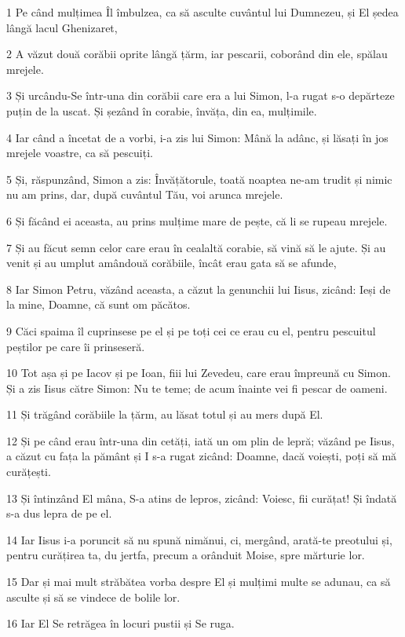 \par 1 Pe când mulțimea Îl îmbulzea, ca să asculte cuvântul lui Dumnezeu, și El ședea lângă lacul Ghenizaret,
\par 2 A văzut două corăbii oprite lângă țărm, iar pescarii, coborând din ele, spălau mrejele.
\par 3 Și urcându-Se într-una din corăbii care era a lui Simon, l-a rugat s-o depărteze puțin de la uscat. Și șezând în corabie, învăța, din ea, mulțimile.
\par 4 Iar când a încetat de a vorbi, i-a zis lui Simon: Mână la adânc, și lăsați în jos mrejele voastre, ca să pescuiți.
\par 5 Și, răspunzând, Simon a zis: Învățătorule, toată noaptea ne-am trudit și nimic nu am prins, dar, după cuvântul Tău, voi arunca mrejele.
\par 6 Și făcând ei aceasta, au prins mulțime mare de pește, că li se rupeau mrejele.
\par 7 Și au făcut semn celor care erau în cealaltă corabie, să vină să le ajute. Și au venit și au umplut amândouă corăbiile, încât erau gata să se afunde,
\par 8 Iar Simon Petru, văzând aceasta, a căzut la genunchii lui Iisus, zicând: Ieși de la mine, Doamne, că sunt om păcătos.
\par 9 Căci spaima îl cuprinsese pe el și pe toți cei ce erau cu el, pentru pescuitul peștilor pe care îi prinseseră.
\par 10 Tot așa și pe Iacov și pe Ioan, fiii lui Zevedeu, care erau împreună cu Simon. Și a zis Iisus către Simon: Nu te teme; de acum înainte vei fi pescar de oameni.
\par 11 Și trăgând corăbiile la țărm, au lăsat totul și au mers după El.
\par 12 Și pe când erau într-una din cetăți, iată un om plin de lepră; văzând pe Iisus, a căzut cu fața la pământ și I s-a rugat zicând: Doamne, dacă voiești, poți să mă curățești.
\par 13 Și întinzând El mâna, S-a atins de lepros, zicând: Voiesc, fii curățat! Și îndată s-a dus lepra de pe el.
\par 14 Iar Iisus i-a poruncit să nu spună nimănui, ci, mergând, arată-te preotului și, pentru curățirea ta, du jertfa, precum a orânduit Moise, spre mărturie lor.
\par 15 Dar și mai mult străbătea vorba despre El și mulțimi multe se adunau, ca să asculte și să se vindece de bolile lor.
\par 16 Iar El Se retrăgea în locuri pustii și Se ruga.
